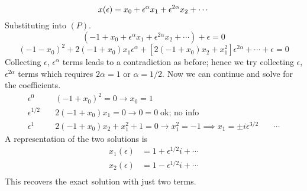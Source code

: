 \documentclass[12pt]{article}
\begin{document}
\begin{equation*}
  x(\epsilon) = x_0 + \epsilon^{\alpha}x_1 + \epsilon^{2\alpha}x_2 + \cdots \\
\end{equation*}
Substituting into $(P)$.
\begin{equation*}
  (-1+x_0+\epsilon^{\alpha}x_1 + \epsilon^{2\alpha}x_2 + \cdots)+\epsilon=0
\end{equation*}
\begin{equation*}
  (-1-x_0)^2+2(-1+x_0)x_1\epsilon^{\alpha} + [2(-1+x_0)x_2+x_1^2]\epsilon^{2\alpha} + \cdots + \epsilon=0
\end{equation*}
Collecting $\epsilon$, $\epsilon^{\alpha}$ terms leads to a contradiction as
before; hence we try collecting $\epsilon$, $\epsilon^{2\alpha}$ terms which
requires $2\alpha=1$ or $\alpha=1/2$. Now we can continue and solve for the
coefficients.
\begin{equation*}
  \begin{aligned}
    \epsilon^0&\quad (-1+x_0)^2=0\longrightarrow x_0=1 \\
    \epsilon^{1/2}&\quad 2(-1+x_0)x_1=0 \longrightarrow 0=0\;\text{ok; no info}\\
    \epsilon^{1}&\quad 2(-1+x_0)x_2+x_1^2+1=0 \longrightarrow x_1^2=-1\implies x_1=\pm i
    \epsilon^{3/2}&\quad \cdots
  \end{aligned}
\end{equation*}
A representation of the two solutions is
\begin{equation*}
  \begin{aligned}
    x_1(\epsilon) &= 1+\epsilon^{1/2}i + \cdots \\
    x_2(\epsilon) &= 1-\epsilon^{1/2}i + \cdots \\
  \end{aligned}
\end{equation*}
This recovers the exact solution with just two terms.
\end{document}
